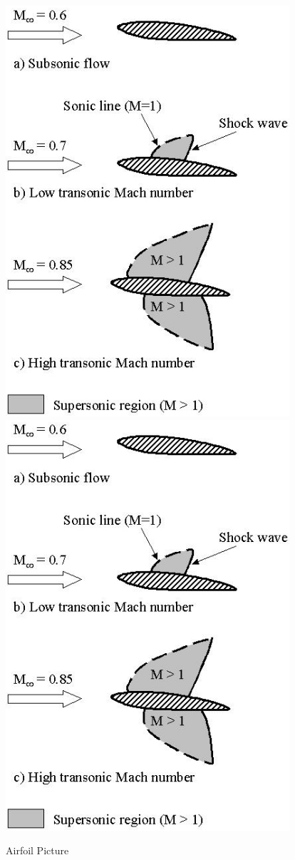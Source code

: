 \begin{figure}[!htbp]
  \begin{center}
    \leavevmode
    \ifpdf
      \includegraphics[height=6in]{aflow}
    \else
      \includegraphics[bb = 92 86 545 742, height=6in]{aflow}
    \fi
    \caption{Airfoil Picture}
    \label{FigAir}
  \end{center}
\end{figure}

